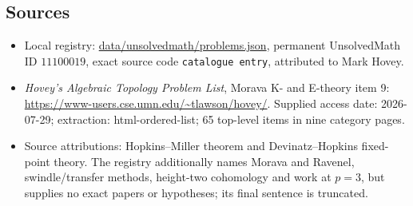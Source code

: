 \documentclass[11pt]{article}
\begin{document}
\subsection{Sources}
\begin{itemize}
\item Local registry: \url{data/unsolvedmath/problems.json}, permanent UnsolvedMath ID $11100019$, exact source code \texttt{catalogue entry}, attributed to Mark Hovey.
\item \emph{Hovey's Algebraic Topology Problem List}, Morava K- and E-theory item 9: \url{https://www-users.cse.umn.edu/~tlawson/hovey/}. Supplied access date: 2026-07-29; extraction: html-ordered-list; 65 top-level items in nine category pages.
\item Source attributions: Hopkins--Miller theorem and Devinatz--Hopkins fixed-point theory. The registry additionally names Morava and Ravenel, swindle/transfer methods, height-two cohomology and work at $p=3$, but supplies no exact papers or hypotheses; its final sentence is truncated.
\end{itemize}
\end{document}
